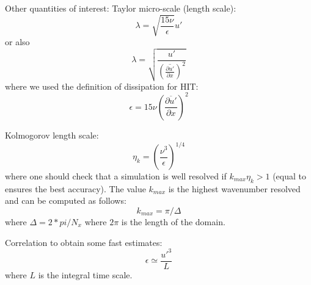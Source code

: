 \documentclass[11pt]{article}
\begin{document}
\noindent
Other quantities of interest:
Taylor micro-scale (length scale):
\begin{equation}
\lambda=\sqrt{\frac{15 \nu}{\epsilon}} u'
\end{equation}
or also 
\begin{equation}
\lambda=\sqrt{\frac{u'}{  \left(  \overline{ \frac{\partial u'}{ \partial  x} } \right)^2}}
\end{equation}
where we used the definition of dissipation for HIT:
\begin{equation}
\epsilon=15 \nu  \left(  \overline{ \frac{\partial u'}{ \partial  x} } \right)^2
\end{equation}

\noindent
Kolmogorov length scale:
\begin{equation}
\eta_k = \left( \frac{\nu^3 }{\epsilon} \right)^{1/4}
\end{equation}
where one should check that a simulation is well resolved if $k_{max} \eta_k > 1$ (equal to ensures the best accuracy).
The value $k_{max}$ is the highest wavenumber resolved and can be computed as follows:
\begin{equation}
k_{max}= \pi / \Delta
\end{equation}
where $\Delta = 2*pi / N_x$ where $2 \pi$ is the length of the domain.

\noindent
Correlation to obtain some fast estimates:
\begin{equation}
\epsilon \simeq \frac{u'^3}{L}
\end{equation}
where $L$ is the integral time scale.
\end{document}
